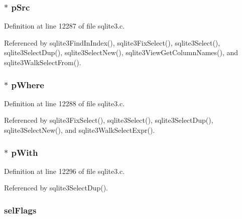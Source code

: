 \hypertarget{struct_select_a84a7e06ff4c94a96573b33b55a0e23cf}{}
\subsubsection[{p\+Src}]{$\ast$ p\+Src}\label{struct_select_a84a7e06ff4c94a96573b33b55a0e23cf}


Definition at line 12287 of file sqlite3.\+c.



Referenced by sqlite3\+Find\+In\+Index(), sqlite3\+Fix\+Select(), sqlite3\+Select(), sqlite3\+Select\+Dup(), sqlite3\+Select\+New(), sqlite3\+View\+Get\+Column\+Names(), and sqlite3\+Walk\+Select\+From().

\hypertarget{struct_select_aa35a11dc7821bfaf357249ff3da68863}{}
\subsubsection[{p\+Where}]{$\ast$ p\+Where}\label{struct_select_aa35a11dc7821bfaf357249ff3da68863}


Definition at line 12288 of file sqlite3.\+c.



Referenced by sqlite3\+Fix\+Select(), sqlite3\+Select(), sqlite3\+Select\+Dup(), sqlite3\+Select\+New(), and sqlite3\+Walk\+Select\+Expr().

\hypertarget{struct_select_a49014e0850234bf861fd5de6ea610b7e}{}
\subsubsection[{p\+With}]{$\ast$ p\+With}\label{struct_select_a49014e0850234bf861fd5de6ea610b7e}


Definition at line 12296 of file sqlite3.\+c.



Referenced by sqlite3\+Select\+Dup().

\hypertarget{struct_select_a395e9a724a388ac62439b4c162e3b051}{}
\subsubsection[{sel\+Flags}]{ sel\+Flags}\label{struct_select_a395e9a724a388ac62439b4c162e3b051}


